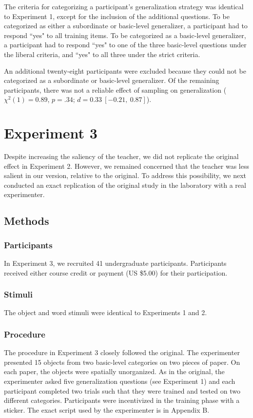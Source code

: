 \documentclass[man]{apa2}
\begin{document}
The criteria for categorizing a participant's generalization strategy was identical to Experiment 1, except for the inclusion of the additional questions. To be categorized as either a subordinate or basic-level generalizer, a participant had to respond ``yes" to all training items. To be categorized as a basic-level generalizer, a participant had to respond ``yes" to one of the three basic-level questions under the liberal criteria, and ``yes" to all three under the strict criteria. 

An additional twenty-eight participants were excluded because they could not be categorized as a subordinate or basic-level generalizer. Of the remaining participants, there was not a reliable effect of sampling on generalization ($\chi^2(1) = 0.89$,  $p = .34$; $d = 0.33\ [-0.21,\ 0.87]$).

\section{Experiment 3}
Despite increasing the saliency of the teacher, we did not replicate the original effect in Experiment 2. However, we remained  concerned that the teacher was  less salient in our version, relative to the original. To address this possibility, we next conducted an exact replication of the original study in the laboratory with a real experimenter.

\subsection{Methods}

\subsubsection{Participants}  In Experiment 3, we recruited 41 undergraduate participants. Participants received either course credit or payment (US \$5.00) for their participation. 

\subsubsection{Stimuli}
The object and word stimuli were identical to Experiments 1 and 2. 

\subsubsection{Procedure}
The procedure in Experiment 3 closely followed the original. The experimenter presented 15 objects from two basic-level categories on two pieces of paper. On each paper, the objects were spatially unorganized. As in the original, the experimenter asked five generalization questions (see Experiment 1) and  each participant completed two trials such that they were trained and tested on two different categories.  Participants were incentivized in the training phase with a sticker. The exact script used by the experimenter is in Appendix B. 
\end{document}
